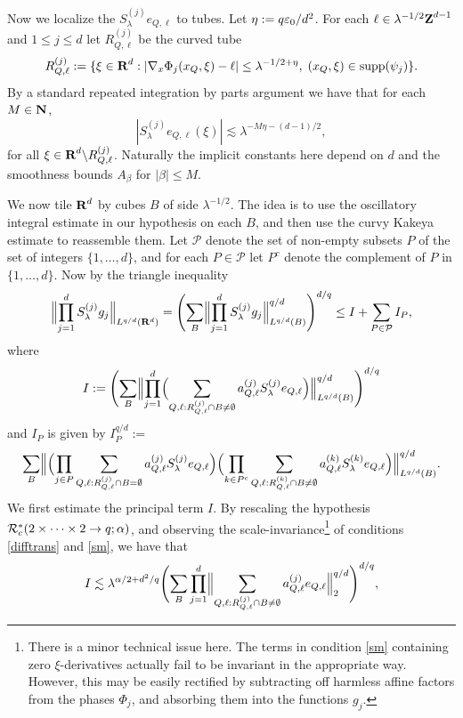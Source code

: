 Now we localize the $S_{\lambda}^{(j)}e_{Q,\ell}$ to tubes.
Let $\eta := q\varepsilon_{0}/d^{2}$. For each $\ell\in
\lambda^{-1/2}{\hbox{\bf Z}}^{d-1}$ and $1\leq j\leq d$ let
$R^{(j)}_{Q,\ell}$ be the curved tube
$$
R^{(j)}_{Q,\ell}:=\{\xi\in{\hbox{\bf R}}^{d}:
|\nabla_{x}\Phi_{j}(x_{Q},\xi)-\ell|\leq\lambda^{-1/2+\eta},\;
(x_Q,\xi)\in{\operatorname{supp}}(\psi_j)\}.
$$
By a standard repeated integration by parts argument we have that
for each $M\in{\hbox{\bf N}}$,
\begin{equation}\label{princ}
|S_{\lambda}^{(j)}e_{Q,\ell}(\xi)|\lesssim\lambda^{-M\eta-(d-1)/2},
\end{equation}
for all $\xi\in {\hbox{\bf R}}^{d}\backslash R_{Q,\ell}^{(j)}$. Naturally the
implicit constants here depend on $d$ and the smoothness bounds
$A_{\beta}$ for $|\beta|\leq M$.

We now tile ${\hbox{\bf R}}^{d}$ by cubes $B$ of side $\lambda^{-1/2}$. The
idea is to use the oscillatory integral estimate in our hypothesis
on each $B$, and then use the curvy Kakeya estimate to reassemble
them. Let $\mathcal{P}$ denote the set of non-empty subsets $P$ of
the set of integers $\{1,\hdots,d\}$, and for each
$P\in\mathcal{P}$ let $P^c$ denote the complement of $P$ in
$\{1,\hdots, d\}$. Now by the triangle inequality
$$
\Bigl\|\prod_{j=1}^{d}S_{\lambda}^{(j)}g_{j}\Bigr\|_{L^{q/d}({\bf
R}^{d})}=
\Biggl(\sum_{B}\Bigl\|\prod_{j=1}^{d}S_{\lambda}^{(j)}g_{j}
\Bigr\|_{L^{q/d}(B)}^{q/d}\Biggr)^{d/q}\leq I
+\sum_{P\in\mathcal{P}}I_{P},
$$
where
$$
I:= \Biggl(\sum_{B}\Bigl\|\prod_{j=1}^{d}\Bigl(\sum_{Q,\ell:
R_{Q,\ell}^{(j)}\cap
B\not=\emptyset}a_{Q,\ell}^{(j)}S_{\lambda}^{(j)}e_{Q,\ell}\Bigr)\Bigr\|
_{L^{q/d}(B)}^{q/d}\Biggr)^{d/q}
$$
and $I_{P}$ is given by $I_{P}^{q/d}:=$
$$
\sum_{B}\Bigl\|\Bigl(\prod_{j\in P}
\sum_{Q,\ell:R_{Q,\ell}^{(j)}\cap B=\emptyset}
a_{Q,\ell}^{(j)}S_{\lambda}^{(j)}e_{Q,\ell}\Bigr)\Bigl(\prod_{k\in
P^c} \sum_{Q,\ell:R_{Q,\ell}^{(k)}\cap B\not=\emptyset}
a_{Q,\ell}^{(k)}S_{\lambda}^{(k)}e_{Q,\ell}\Bigr)
\Bigr\|_{L^{q/d}(B)}^{q/d}.
$$
We first estimate the principal term $I$. By rescaling the
hypothesis ${\mathcal{R}}^{*}_{c}(2\times\cdots\times 2\rightarrow
q;\alpha)$, and observing the scale-invariance\footnote{
There is a minor technical issue here.
The terms in condition \eqref{sm} containing
zero $\xi$-derivatives actually fail to be
invariant in the appropriate way. However, this may be easily
rectified by subtracting off harmless affine factors from the phases
$\Phi_j$, and absorbing
them into the functions $g_j$.}
of conditions
\eqref{difftrans} and \eqref{sm}, we have that
$$I\lesssim \lambda^{\alpha/2+d^{2}/q}
\Biggl(\sum_{B}\prod_{j=1}^{d}\Bigl\|\sum_{Q,\ell:
R_{Q,\ell}^{(j)}\cap
B\not=\emptyset}a_{Q,\ell}^{(j)}e_{Q,\ell}\Bigr\|
_{2}^{q/d}\Biggr)^{d/q},
$$
